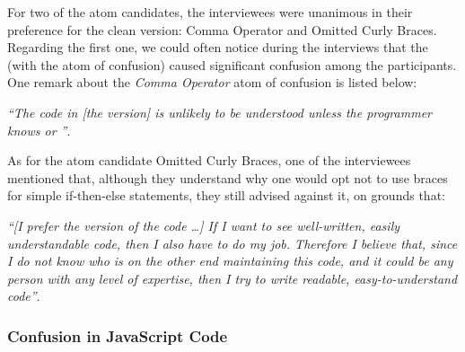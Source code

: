 For two of the atom candidates, the interviewees were unanimous in their preference for the clean version: Comma Operator and Omitted Curly Braces. Regarding the first one, we could often notice during the interviews that the \emph{\lhs} (with the atom of confusion) caused significant confusion among the participants. One remark about the \emph{Comma Operator} atom of confusion is listed below:


\begin{mq}
\emph{``The code in [the \lhs version] is unlikely to be understood unless the programmer knows \clang or \cpplang''}.
\end{mq}

As for the atom candidate Omitted Curly Braces, one of the interviewees mentioned that, although they understand why one would opt not to use braces for simple if-then-else statements, they still advised against it, on grounds that:

\begin{mq}
\emph{``[I prefer the \rhs version of the code \ldots]
If I want to see well-written, easily understandable code, then I also have to do my job. Therefore I believe that, since I do not know who is on the other end maintaining this code, and it could be any person with any level of expertise, then I try to write readable, easy-to-understand code''}.
\end{mq}





\subsubsection*{Confusion in JavaScript Code} 


